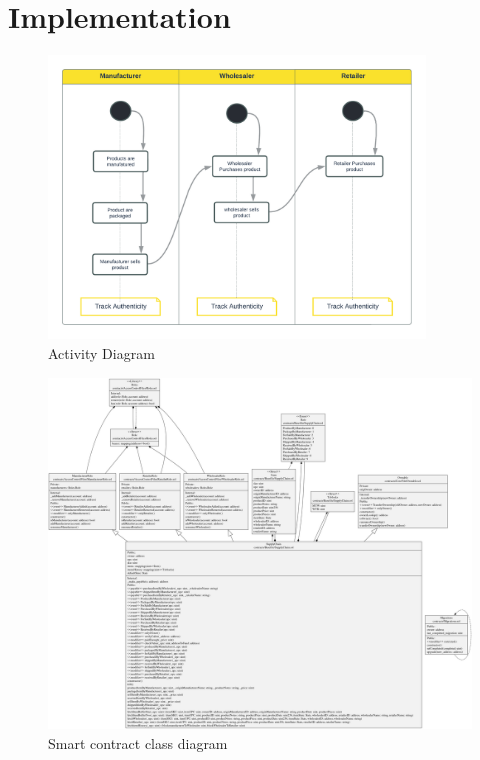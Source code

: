 \chapter{Implementation}

    \begin{figure}[h]
    \centering
      \includegraphics[width=10cm]{includes/figures/Activity Diagram.png} 
      \caption{Activity Diagram}
      \label{Activity Diagram}
    \end{figure}
    
    
    \begin{figure}[h]
    \centering
      \includegraphics[width=22cm, angle=90]{includes/figures/OverallClassDiagram.png} 
      \caption{Smart contract class diagram}
      \label{Overall Class Diagram}
    \end{figure}